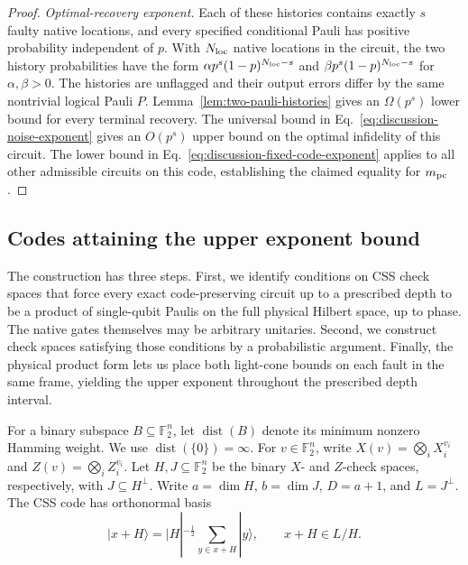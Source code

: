 \documentclass[aps,prl,reprint,notitlepage,nofootinbib,nobibnotes]{revtex4-2}
\begin{document}
\begin{proof}
\emph{Optimal-recovery exponent.}
Each of these histories contains exactly $s$ faulty native locations, and every specified
conditional Pauli has positive probability independent of $p$. With $N_{\rm loc}$ native locations
in the circuit, the two history probabilities have the form $\alpha p^s(1-p)^{N_{\rm loc}-s}$ and
$\beta p^s(1-p)^{N_{\rm loc}-s}$ for $\alpha,\beta>0$. The histories are unflagged and their output
errors differ by the same nontrivial logical Pauli $P$. Lemma~\ref{lem:two-pauli-histories} gives
an $\Omega(p^s)$ lower bound for every terminal recovery. The universal bound in
Eq.~\eqref{eq:discussion-noise-exponent} gives an $O(p^s)$ upper bound on the optimal infidelity of
this circuit. The lower bound in Eq.~\eqref{eq:discussion-fixed-code-exponent} applies to all other
admissible circuits on this code, establishing the claimed equality for $m_{\rm pc}$.
\end{proof}


\subsection*{Codes attaining the upper exponent bound}
\label{em:upper-saturation}

The construction has three steps. First, we identify conditions on CSS check spaces that force
every exact code-preserving circuit up to a prescribed depth to be a product of single-qubit Paulis
on the full physical Hilbert space, up to phase. The native gates themselves may be arbitrary
unitaries. Second, we construct check spaces satisfying those conditions by a probabilistic
argument. Finally, the physical product form lets us place both light-cone bounds on each fault in
the same frame, yielding the upper exponent throughout the prescribed depth interval.

For a binary subspace $B\subseteq\mathbb F_2^n$, let $\operatorname{dist}(B)$ denote its minimum
nonzero Hamming weight. We use $\operatorname{dist}(\{0\})=\infty$. For $v\in\mathbb F_2^n$, write
$X(v)=\bigotimes_i X_i^{v_i}$ and $Z(v)=\bigotimes_i Z_i^{v_i}$. Let $H,J\subseteq\mathbb F_2^n$ be
the binary $X$- and $Z$-check spaces, respectively, with $J\subseteq H^\perp$. Write $a=\dim H$,
$b=\dim J$, $D=a+1$, and $L=J^\perp$. The CSS code has orthonormal basis
\begin{equation}\label{em:upper-css-basis}
 |x+H\rangle=|H|^{-\frac{1}{2}}\sum_{y\in x+H}|y\rangle ,
 \qquad x+H\in L/H .
\end{equation}
\end{document}
